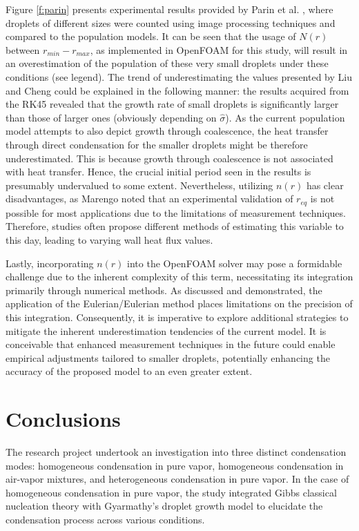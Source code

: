 \documentclass[12pt]{article}
\numberwithin{equation}{section}
\begin{document}
Figure \ref{f:parin} presents experimental results provided by Parin et al. \cite{PARIN2020115718}, where droplets of different sizes were counted using image processing techniques and compared to the population models. It can be seen that the usage of $N(r)$ between $r_{min}-r_{max}$, as implemented in OpenFOAM for this study, will result in an overestimation of the population of these very small droplets under these conditions (see legend). The trend of underestimating the values presented by Liu and Cheng could be explained in the following manner: the results acquired from the RK45 revealed that the growth rate of small droplets is significantly larger than those of larger ones (obviously depending on $\hat{\sigma}$). As the current population model attempts to also depict growth through coalescence, the heat transfer through direct condensation for the smaller droplets might be therefore underestimated. This is because growth through coalescence is not associated with heat transfer. Hence, the crucial initial period seen in the results is presumably undervalued to some extent. Nevertheless, utilizing $n(r)$ has clear disadvantages, as Marengo noted that an experimental validation of $r_{eq}$ is not possible for most applications due to the limitations of measurement techniques. Therefore, studies often propose different methods of estimating this variable to this day, leading to varying wall heat flux values.

Lastly, incorporating $n(r)$ into the OpenFOAM solver may pose a formidable challenge due to the inherent complexity of this term, necessitating its integration primarily through numerical methods. As discussed and demonstrated, the application of the Eulerian/Eulerian method places limitations on the precision of this integration. Consequently, it is imperative to explore additional strategies to mitigate the inherent underestimation tendencies of the current model. It is conceivable that enhanced measurement techniques in the future could enable empirical adjustments tailored to smaller droplets, potentially enhancing the accuracy of the proposed model to an even greater extent.
\newpage
\section{Conclusions}\label{s:Conclusions}

The research project undertook an investigation into three distinct condensation modes: homogeneous condensation in pure vapor, homogeneous condensation in air-vapor mixtures, and heterogeneous condensation in pure vapor. In the case of homogeneous condensation in pure vapor, the study integrated Gibbs classical nucleation theory with Gyarmathy's droplet growth model to elucidate the condensation process across various conditions.
\end{document}
